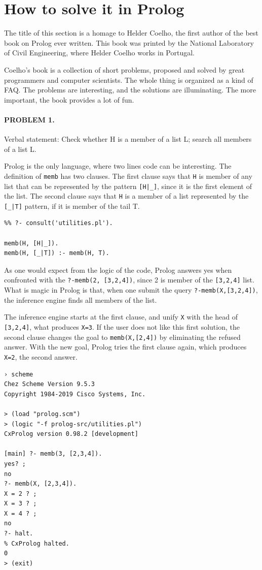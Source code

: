 \documentclass[a4paper,12pt]{book}
\begin{document}
\section{How to solve it in Prolog}
The title of this section is a homage to Helder
Coelho, the first author of the best book on
Prolog ever written. This book was printed by
the National Laboratory of Civil Engineering, where
Helder Coelho works in Portugal. 

Coelho's book is a collection of short problems,
proposed and solved by great programmers and computer
scientists. The whole thing is organized as a kind of
FAQ. The problems are interesting, and the solutions
are illuminating. The more important, the book provides
a lot of fun. 

\pagebreak
\paragraph{PROBLEM 1.} Verbal statement: Check whether H
is a member of a list L; search all members of a list L.

Prolog is the only language, where two lines code can be
interesting. The definition of \verb|memb| has two clauses.
The first clause says that \verb|H| is member of any list that
can be represented by the pattern \verb/[H|_]/, since it
is the first element of the list. The second clause says that
\verb|H| is a member of a list represented by the \verb/[_|T]/
pattern, if it is member of the tail T.
\begin{verbatim}
%% ?- consult('utilities.pl').

memb(H, [H|_]).
memb(H, [_|T]) :- memb(H, T).
\end{verbatim}

As one would expect from the logic of the code,
Prolog answers yes when confronted with the
\verb|?-memb(2, [3,2,4])|, since 2 is member
of the \verb/[3,2,4]/ list. What is magic in
Prolog is that, when one submit the query
\verb|?-memb(X,[3,2,4])|, the inference engine
finds all members of the list.

The inference engine starts at the first clause,
and unify \verb|X| with the head of \verb|[3,2,4]|,
what produces \verb|X=3|. If the user does not like
this first solution, the second clause changes the
goal to \verb|memb(X,[2,4])| by eliminating the
refused answer. With the new goal, Prolog tries the
first clause again, which produces \verb|X=2|, the
second answer.
\begin{verbatim}
› scheme
Chez Scheme Version 9.5.3
Copyright 1984-2019 Cisco Systems, Inc.

> (load "prolog.scm")
> (logic "-f prolog-src/utilities.pl")
CxProlog version 0.98.2 [development]

[main] ?- memb(3, [2,3,4]).
yes? ;
no
?- memb(X, [2,3,4]).
X = 2 ? ;
X = 3 ? ;
X = 4 ? ;
no
?- halt.
% CxProlog halted.
0
> (exit)
\end{verbatim}
\end{document}
